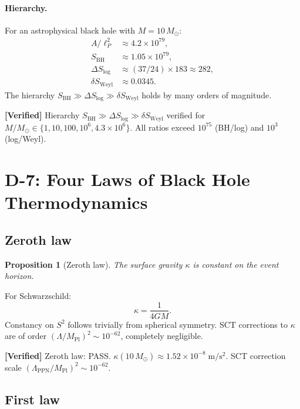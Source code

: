 \documentclass[11pt,a4paper]{article}
\newcommand{\lP}{\ell_P}
\newcommand{\MP}{M_{\mathrm{Pl}}}
\theoremstyle{plain}
\newtheorem{proposition}[theorem]{Proposition}
\theoremstyle{definition}
\newcommand{\verified}[1]{%
  \par\smallskip\noindent
  \colorbox{green!10}{\parbox{\dimexpr\linewidth-2\fboxsep}{%
    \textcolor{green!50!black}{\textbf{[Verified]}} #1}}%
  \par\smallskip}
\begin{document}
\paragraph{Hierarchy.}
For an astrophysical black hole with $M = 10\,M_\odot$:
\begin{align}
  A/\lP^2 &\approx 4.2 \times 10^{79}, \\
  S_{\mathrm{BH}} &\approx 1.05 \times 10^{79}, \\
  \Delta S_{\log} &\approx (37/24)\times 183 \approx 282, \\
  \delta S_{\mathrm{Weyl}} &\approx 0.0345.
\end{align}
The hierarchy $S_{\mathrm{BH}} \gg \Delta S_{\log} \gg \delta S_{\mathrm{Weyl}}$
holds by many orders of magnitude.

\verified{Hierarchy $S_{\mathrm{BH}} \gg \Delta S_{\log} \gg \delta S_{\mathrm{Weyl}}$
verified for $M/M_\odot \in \{1, 10, 100, 10^6, 4.3\times 10^6\}$.
All ratios exceed $10^{75}$ (BH/log) and $10^3$ (log/Weyl).}


\section{D-7: Four Laws of Black Hole Thermodynamics}
\label{sec:D7}

\subsection{Zeroth law}

\begin{proposition}[Zeroth law]\label{prop:zeroth}
The surface gravity $\kappa$ is constant on the event horizon.
\end{proposition}

For Schwarzschild:
\begin{equation}
  \kappa = \frac{1}{4GM}.
\end{equation}
Constancy on $S^2$ follows trivially from spherical symmetry.
SCT corrections to $\kappa$ are of order $(\Lambda/\MP)^2 \sim 10^{-62}$,
completely negligible.

\verified{Zeroth law: PASS. $\kappa(10\,M_\odot) \approx 1.52\times 10^{-8}\;\mathrm{m/s^2}$.
SCT correction scale $(\Lambda_{\mathrm{PPN}}/\MP)^2 \sim 10^{-62}$.}

\subsection{First law}
\end{document}
